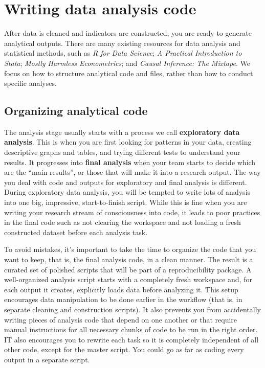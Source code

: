 
\section{Writing data analysis code}

After data is cleaned and indicators are constructed, you are ready to generate analytical outputs.
There are many existing resources for data analysis and statistical methods, such as
\textit{R for Data Science};
\textit{A Practical Introduction to Stata};
\textit{Mostly Harmless Econometrics};
and \textit{Causal Inference: The Mixtape}.
We focus on how to structure analytical code and files, rather than how to conduct specific analyses.

\subsection{Organizing analytical code}

The analysis stage usually starts with a process we call \textbf{exploratory data analysis}.
This is when you are first looking for patterns in your data,
creating descriptive graphs and tables,
and trying different tests to understand your results.
It progresses into \textbf{final analysis} when your team starts to decide which are the ``main results'', or
those that will make it into a research output.
The way you deal with code and outputs for exploratory and final analysis is different.
During exploratory data analysis,
you will be tempted to write lots of analysis into one big, impressive, start-to-finish script.
While this is fine when you are writing your research stream of consciousness into code, 
it leads to poor practices in the final code such as not clearing the workspace 
and not loading a fresh constructed dataset before each analysis task.

To avoid mistakes, it's important to take the time
to organize the code that you want to keep, that is,
the final analysis code, in a clean manner.
The result is a curated set of polished scripts that will be part of a reproducibility package.
A well-organized analysis script starts with a completely fresh workspace
and, for each output it creates, explicitly loads data before analyzing it.
This setup encourages data manipulation to be done earlier in the workflow
(that is, in separate cleaning and construction scripts).
It also prevents you from accidentally writing pieces of analysis code that depend on one another
or that require manual instructions for all necessary chunks of code to be run in the right order.
IT also encourages you to rewrite each task so it is completely independent of all other code,
except for the master script.
You could go as far as coding every output in a separate script.


